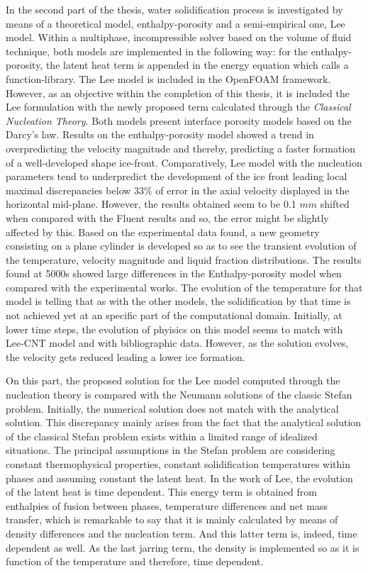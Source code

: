 \noindent In the second part of the thesis, water solidification process is investigated by means of a theoretical model, enthalpy-porosity and a semi-empirical one, Lee model. Within a multiphase, incompressible solver based on the volume of fluid technique, both models are implemented in the following way: for the enthalpy-porosity, the latent heat term is appended in the energy equation which calls a function-library. The Lee model is included in the OpenFOAM framework. However, as an objective within the completion of this thesis, it is included the Lee formulation with the newly proposed term calculated through the \textit{Classical Nucleation Theory}. Both models present interface porosity models based on the Darcy's law. Results on the enthalpy-porosity model showed a trend in overpredicting the velocity magnitude and thereby, predicting a faster formation of a well-developed shape ice-front. Comparatively, Lee model with the nucleation parameters tend to underpredict the development of the ice front leading local maximal discrepancies below 33\% of error in the axial velocity displayed in the horizontal mid-plane. However, the results obtained seem to be 0.1 $mm$ shifted when compared with the Fluent results and so, the error might be slightly affected by this. Based on the experimental data found, a new geometry consisting on a plane cylinder is developed so as to see the transient evolution of the temperature, velocity magnitude and liquid fraction distributions. The results found at 5000s showed large differences in the Enthalpy-porosity model when compared with the experimental works. The evolution of the temperature for that model is telling that as with the other models, the solidification by that time is not achieved yet at an specific part of the computational domain. Initially, at lower time steps, the evolution of phyisics on this model seems to match with Lee-CNT model and with bibliographic data. However, as the solution evolves, the velocity gets reduced leading a lower ice formation.

\noindent On this part, the proposed solution for the Lee model computed through the nucleation theory is compared with the Neumann solutions of the classic Stefan problem. Initially, the numerical solution does not match with the analytical solution. This discrepancy mainly arises from the fact that the analytical solution of the classical Stefan problem exists within a limited range of idealized situations. The principal assumptions in the Stefan problem are considering constant thermophysical properties, constant solidification temperatures within phases and assuming constant the latent heat. In the work of Lee, the evolution of the latent heat is time dependent. This energy term is obtained from enthalpies of fusion between phases, temperature differences and net mass transfer, which is remarkable to say that it is mainly calculated by means of density differences and the nucleation term. And this latter term is, indeed, time dependent as well. As the last jarring term, the density is implemented so as it is function of the temperature and therefore, time dependent.

